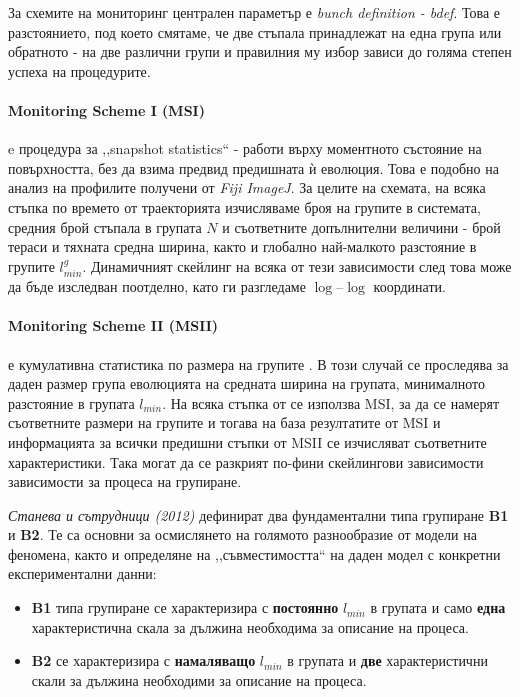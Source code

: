 За схемите на мониторинг централен параметър е \textit{bunch definition - bdef}. Това е разстоянието, под което смятаме, че две стъпала принадлежат на една група или обратното - на две различни групи и правилния му избор зависи до голяма степен успеха на процедурите.

\paragraph{Monitoring Scheme I (MSI)} e процедура за ,,snapshot statistics`` \cite{TonchevArxiv2012} - работи върху моментното състояние на повърхността, без да взима предвид предишната ѝ еволюция. Това е подобно на анализ на профилите получени от \textit{Fiji ImageJ}. За целите на схемата, на всяка стъпка по времето от траекторията изчисляваме броя на групите в системата, средния брой стъпала в групата $N$ и съответните допълнителни величини - брой тераси и тяхната средна ширина, както и глобално най-малкото разстояние в групите $l_{min}^g$. Динамичният скейлинг на всяка от тези зависимости след това може да бъде изследван поотделно, като ги разгледаме $\log\mbox{--}\log$ координати.

\paragraph{Monitoring Scheme II (MSII)} е кумулативна статистика по размера на групите \cite{TonchevArxiv2012}. В този случай се проследява за даден размер група еволюцията на средната ширина на групата, минималното разстояние в групата $l_{min}$. На всяка стъпка от се използва MSI, за да се намерят съответните размери на групите и тогава на база резултатите от MSI и информацията за всички предишни стъпки от MSII се изчисляват съответните характеристики. Така могат да се разкрият по-фини скейлингови зависимости зависимости за процеса на групиране.

\textit{Станева и сътрудници (2012)} \cite{Staneva2012} дефинират два фундаментални типа групиране \textbf{B1} и \textbf{B2}. Те са основни за осмислянето на голямото разнообразие от модели на феномена, както и определяне на ,,съвместимостта`` на даден модел с конкретни експериментални данни:
\begin{itemize}
    \item \textbf{B1} типа групиране се характеризира с \textbf{постоянно} $l_{min}$ в групата и само \textbf{една} характеристична скала за дължина необходима за описание на процеса.
    \item \textbf{B2} се характеризира с \textbf{намаляващо} $l_{min}$ в групата и \textbf{две} характеристични скали за дължина необходими за описание на процеса.
\end{itemize}

